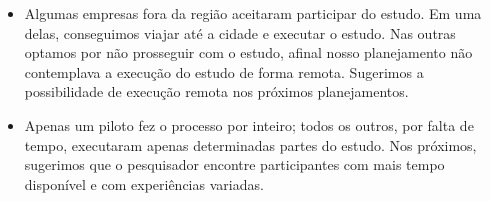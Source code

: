 \begin{itemize}
	\item Algumas empresas fora da região aceitaram participar do estudo. Em uma delas,
	conseguimos viajar até a cidade e executar o estudo. Nas outras optamos por não
	prosseguir com o estudo, afinal nosso planejamento não contemplava a execução
	do estudo de forma remota. Sugerimos a possibilidade de execução remota nos 
	próximos planejamentos.
	
	\item Apenas um piloto fez o processo por inteiro; todos os outros, por falta de tempo, 
	executaram apenas determinadas partes do estudo. Nos próximos, sugerimos
	que o pesquisador encontre participantes com mais tempo disponível e com experiências
	variadas.  
	
\end{itemize}
